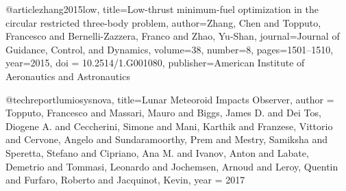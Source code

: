 @article{zhang2015low,
  title={Low-thrust minimum-fuel optimization in the circular restricted three-body problem},
  author={Zhang, Chen and Topputo, Francesco and Bernelli-Zazzera, Franco and Zhao, Yu-Shan},
  journal={Journal of Guidance, Control, and Dynamics},
  volume={38},
  number={8},
  pages={1501--1510},
  year={2015},
  doi = {10.2514/1.G001080},
  publisher={American Institute of Aeronautics and Astronautics}
}

@techreport{lumiosysnova,
title={Lunar Meteoroid Impacts Observer},
author = {Topputo, Francesco and Massari, Mauro and Biggs, James D. and Dei Tos, Diogene A. and Ceccherini, Simone and Mani, Karthik and Franzese, Vittorio and Cervone, Angelo and Sundaramoorthy, Prem and Mestry, Samiksha and Speretta, Stefano and Cipriano, Ana M. and Ivanov, Anton and Labate, Demetrio and Tommasi, Leonardo and Jochemsen, Arnoud  and Leroy, Quentin and Furfaro, Roberto and Jacquinot, Kevin},
year = {2017}
}
